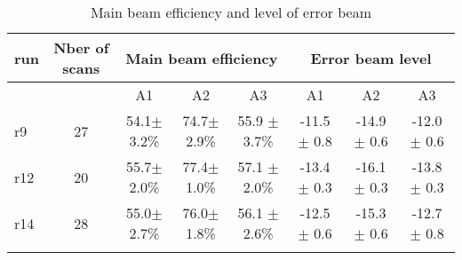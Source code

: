 \begin{table*}[!h]
\caption{Main beam efficiency and level of error beam}
\label{tab:MB}
\centering
\begin{tabular}{l| c | c c c | c c c}
\hline\hline
\noalign{\smallskip}
run  & Nber of scans & \multicolumn{3}{c}{Main beam efficiency } & \multicolumn{3}{c}{Error beam level} \\
\hline
     &               &  A1    &    A2   &  A3  & A1  &  A2  & A3   \\
            \hline
r9    & 27  &  54.1$\pm$ 3.2\%    &  74.7$\pm$ 2.9\% & 55.9 $\pm$ 3.7\%   &  -11.5 $\pm$ 0.8    &  -14.9 $\pm$ 0.6   &  -12.0 $\pm$ 0.6   \\
r12   & 20  &  55.7$\pm$ 2.0\%    &  77.4$\pm$ 1.0\% & 57.1 $\pm$ 2.0\%   &  -13.4 $\pm$ 0.3    &  -16.1 $\pm$ 0.3   &  -13.8 $\pm$ 0.3   \\
r14   & 28  &  55.0$\pm$ 2.7\%    &  76.0$\pm$ 1.8\% & 56.1 $\pm$ 2.6\%   &  -12.5 $\pm$ 0.6    &  -15.3 $\pm$ 0.6   &  -12.7 $\pm$ 0.8   \\
            \noalign{\smallskip}
            \hline
\end{tabular}
\end{table*}

